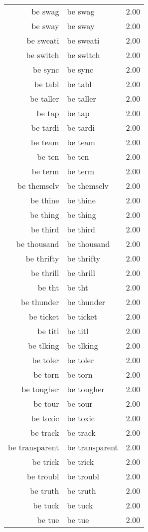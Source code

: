 \begin{table}[ht]
\begin{tabular}{rlr}
  be swag & be swag & 2.00 \\ 
  be sway & be sway & 2.00 \\ 
  be sweati & be sweati & 2.00 \\ 
  be switch & be switch & 2.00 \\ 
  be sync & be sync & 2.00 \\ 
  be tabl & be tabl & 2.00 \\ 
  be taller & be taller & 2.00 \\ 
  be tap & be tap & 2.00 \\ 
  be tardi & be tardi & 2.00 \\ 
  be team & be team & 2.00 \\ 
  be ten & be ten & 2.00 \\ 
  be term & be term & 2.00 \\ 
  be themselv & be themselv & 2.00 \\ 
  be thine & be thine & 2.00 \\ 
  be thing & be thing & 2.00 \\ 
  be third & be third & 2.00 \\ 
  be thousand & be thousand & 2.00 \\ 
  be thrifty & be thrifty & 2.00 \\ 
  be thrill & be thrill & 2.00 \\ 
  be tht & be tht & 2.00 \\ 
  be thunder & be thunder & 2.00 \\ 
  be ticket & be ticket & 2.00 \\ 
  be titl & be titl & 2.00 \\ 
  be tlking & be tlking & 2.00 \\ 
  be toler & be toler & 2.00 \\ 
  be torn & be torn & 2.00 \\ 
  be tougher & be tougher & 2.00 \\ 
  be tour & be tour & 2.00 \\ 
  be toxic & be toxic & 2.00 \\ 
  be track & be track & 2.00 \\ 
  be transparent & be transparent & 2.00 \\ 
  be trick & be trick & 2.00 \\ 
  be troubl & be troubl & 2.00 \\ 
  be truth & be truth & 2.00 \\ 
  be tuck & be tuck & 2.00 \\ 
  be tue & be tue & 2.00 \\ 

\end{tabular}
\end{table}
